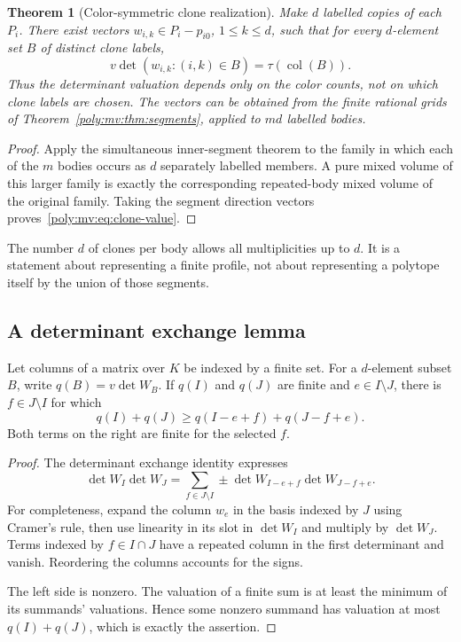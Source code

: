 \documentclass[11pt,a4paper]{article}
\numberwithin{equation}{section}
\newtheorem{theorem}{Theorem}[section]
\theoremstyle{plain}
\begin{document}
\begin{theorem}[Color-symmetric clone realization]
\label{poly:mv:thm:clones}
Make $d$ labelled copies of each $P_i$. There exist vectors
$w_{i,k}\in P_i-p_{i0}$, $1\le k\le d$, such that for every $d$-element
set $B$ of distinct clone labels,
\begin{equation}
\label{poly:mv:eq:clone-value}
 v\det(w_{i,k}:(i,k)\in B)=\tau(\operatorname{col}(B)).
\end{equation}
Thus the determinant valuation depends only on the color counts, not on
which clone labels are chosen. The vectors can be obtained from the
finite rational grids of Theorem~\ref{poly:mv:thm:segments}, applied to $md$
labelled bodies.
\end{theorem}
\begin{proof}
Apply the simultaneous inner-segment theorem to the family in which
each of the $m$ bodies occurs as $d$ separately labelled members. A pure
mixed volume of this larger family is exactly the corresponding
repeated-body mixed volume of the original family. Taking the segment
direction vectors proves~\eqref{poly:mv:eq:clone-value}.
\end{proof}

The number $d$ of clones per body allows all multiplicities up to $d$.
It is a statement about representing a finite profile, not about
representing a polytope itself by the union of those segments.

\subsection{A determinant exchange lemma}
\begin{lemma}
\label{poly:mv:lem:valued-exchange}
Let columns of a matrix over $K$ be indexed by a finite set. For a
$d$-element subset $B$, write $q(B)=v\det W_B$. If $q(I)$ and $q(J)$ are
finite and $e\in I\setminus J$, there is $f\in J\setminus I$ for which
\begin{equation}
\label{poly:mv:eq:valued-exchange}
 q(I)+q(J)\ge q(I-e+f)+q(J-f+e).
\end{equation}
Both terms on the right are finite for the selected $f$.
\end{lemma}
\begin{proof}
The determinant exchange identity expresses
\[
 \det W_I\det W_J
   =\sum_{f\in J\setminus I}\pm
       \det W_{I-e+f}\det W_{J-f+e}.
\]
For completeness, expand the column $w_e$ in the basis indexed by $J$
using Cramer's rule, then use linearity in its slot in $\det W_I$ and
multiply by $\det W_J$. Terms indexed by $f\in I\cap J$ have a repeated
column in the first determinant and vanish. Reordering the columns
accounts for the signs.

The left side is nonzero. The valuation of a finite sum is at least the
minimum of its summands' valuations. Hence some nonzero summand has
valuation at most $q(I)+q(J)$, which is exactly the assertion.
\end{proof}
\end{document}
